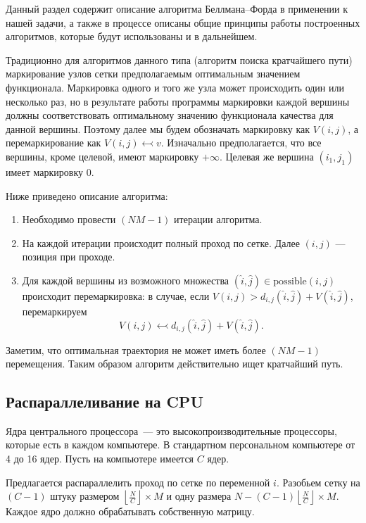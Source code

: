 Данный раздел содержит описание алгоритма Беллмана--Форда в применении к нашей задачи, а также в процессе описаны общие принципы работы построенных алгоритмов, которые будут использованы и в дальнейшем.

Традиционно для алгоритмов данного типа (алгоритм поиска кратчайшего пути) маркирование узлов сетки предполагаемым оптимальным значением функционала.
Маркировка одного и того же узла может происходить один или несколько раз, но в результате работы программы маркировки каждой вершины должны соответствовать оптимальному значению функционала качества для данной вершины.
Поэтому далее мы будем обозначать маркировку как $V(i, j)$, а перемаркирование как $V(i, j) \leftarrowtail v$.
Изначально предполагается, что все вершины, кроме целевой, имеют маркировку $+\infty$. Целевая же вершина $(i_1, j_1)$ имеет маркировку $0$.

Ниже приведено описание алгоритма:

\begin{enumerate}
    \item Необходимо провести $(NM - 1)$ итерации алгоритма.
    \item На каждой итерации происходит полный проход по сетке. Далее $(i,j)$ --- позиция при проходе.
    \item Для каждой вершины из возможного множества $(\hat i, \hat j) \in \mathrm{possible}(i,j)$ происходит перемаркировка: в случае, если $V(i, j) > d_{i,j}(\hat i, \hat j) + V(\hat i, \hat j)$, перемаркируем
    \[
        V(i,j) \leftarrowtail d_{i,j}(\hat i, \hat j) + V(\hat i, \hat j).
    \]
\end{enumerate}

Заметим, что оптимальная траектория не может иметь более $(NM - 1)$ перемещения. Таким образом алгоритм действительно ищет кратчайший путь.

\subsection{Распараллеливание на CPU}
Ядра центрального процессора~--- это высокопроизводительные процессоры, которые есть в каждом компьютере. В стандартном персональном компьютере от 4 до 16 ядер. Пусть на компьютере имеется $C$ ядер.

Предлагается распараллелить проход по сетке по переменной $i$. Разобьем сетку на $(C-1)$ штуку размером $\left\lfloor \frac{N}{C}\right\rfloor \times M$ и одну размера $N-(C-1)\left\lfloor \frac{N}{C} \right\rfloor \times M$. Каждое ядро должно обрабатывать собственную матрицу.

